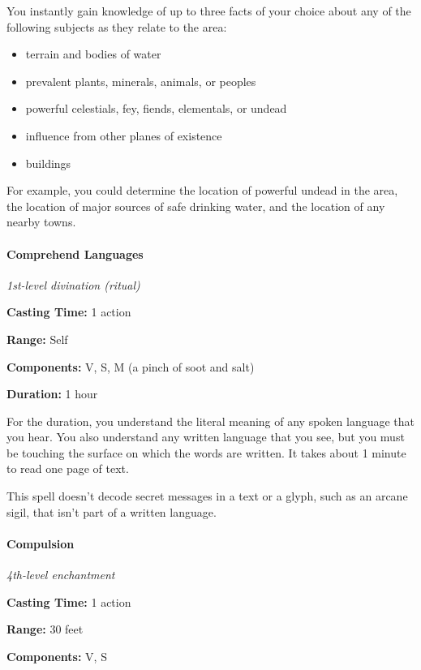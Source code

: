 \documentclass[
]{article}
\providecommand{\tightlist}{%
  \setlength{\itemsep}{0pt}\setlength{\parskip}{0pt}}
\begin{document}
You instantly gain knowledge of up to three facts of your choice about
any of the following subjects as they relate to the area:

\begin{itemize}
\tightlist
\item
  terrain and bodies of water
\item
  prevalent plants, minerals, animals, or peoples
\item
  powerful celestials, fey, fiends, elementals, or undead
\item
  influence from other planes of existence
\item
  buildings
\end{itemize}

For example, you could determine the location of powerful undead in the
area, the location of major sources of safe drinking water, and the
location of any nearby towns.

\hypertarget{comprehend-languages}{%
\paragraph{Comprehend Languages}\label{comprehend-languages}}

\emph{1st-level divination (ritual)}

\textbf{Casting Time:} 1 action

\textbf{Range:} Self

\textbf{Components:} V, S, M (a pinch of soot and salt)

\textbf{Duration:} 1 hour

For the duration, you understand the literal meaning of any spoken
language that you hear. You also understand any written language that
you see, but you must be touching the surface on which the words are
written. It takes about 1 minute to read one page of text.

This spell doesn't decode secret messages in a text or a glyph, such as
an arcane sigil, that isn't part of a written language.

\hypertarget{compulsion}{%
\paragraph{Compulsion}\label{compulsion}}

\emph{4th-level enchantment}

\textbf{Casting Time:} 1 action

\textbf{Range:} 30 feet

\textbf{Components:} V, S
\end{document}
